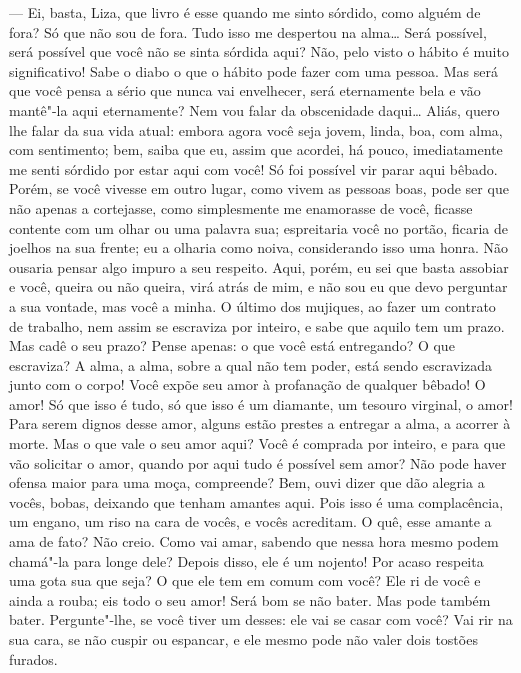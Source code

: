 --- Ei, basta, Liza, que livro é esse quando me sinto sórdido, como alguém
de fora? Só que não sou de fora. Tudo isso me despertou na alma\ldots{} Será
possível, será possível que você não se sinta sórdida aqui? Não, pelo
visto o hábito é muito significativo! Sabe o diabo o que o hábito pode
fazer com uma pessoa. Mas será que você pensa a sério que nunca vai
envelhecer, será eternamente bela e vão mantê"-la aqui eternamente? Nem
vou falar da obscenidade daqui\ldots{} Aliás, quero lhe falar da sua vida
atual: embora agora você seja jovem, linda, boa, com alma, com
sentimento; bem, saiba que eu, assim que acordei, há pouco,
imediatamente me senti sórdido por estar aqui com você! Só foi possível
vir parar aqui bêbado. Porém, se você vivesse em outro lugar, como vivem
as pessoas boas, pode ser que não apenas a cortejasse, como simplesmente
me enamorasse de você, ficasse contente com um olhar ou uma palavra sua;
espreitaria você no portão, ficaria de joelhos na sua frente; eu a
olharia como noiva, considerando isso uma honra. Não ousaria pensar algo
impuro a seu respeito. Aqui, porém, eu sei que basta assobiar e você,
queira ou não queira, virá atrás de mim, e não sou eu que devo perguntar
a sua vontade, mas você a minha. O último dos mujiques, ao fazer um
contrato de trabalho, nem assim se escraviza por inteiro, e sabe que
aquilo tem um prazo. Mas cadê o seu prazo? Pense apenas: o que você está
entregando? O que escraviza? A alma, a alma, sobre a qual não tem poder,
está sendo escravizada junto com o corpo! Você expõe seu amor à
profanação de qualquer bêbado! O amor! Só que isso é tudo, só que isso é
um diamante, um tesouro virginal, o amor! Para serem dignos desse amor,
alguns estão prestes a entregar a alma, a acorrer à morte. Mas o que
vale o seu amor aqui? Você é comprada por inteiro, e para que vão
solicitar o amor, quando por aqui tudo é possível sem amor? Não pode
haver ofensa maior para uma moça, compreende? Bem, ouvi dizer que dão
alegria a vocês, bobas, deixando que tenham amantes aqui. Pois isso é
uma complacência, um engano, um riso na cara de vocês, e vocês
acreditam. O quê, esse amante a ama de fato? Não creio. Como vai amar,
sabendo que nessa hora mesmo podem chamá"-la para longe dele? Depois
disso, ele é um nojento! Por acaso respeita uma gota sua que seja? O que
ele tem em comum com você? Ele ri de você e ainda a rouba; eis todo o
seu amor! Será bom se não bater. Mas pode também bater. Pergunte"-lhe, se
você tiver um desses: ele vai se casar com você? Vai rir na sua cara, se
não cuspir ou espancar, e ele mesmo pode não valer dois tostões furados.
